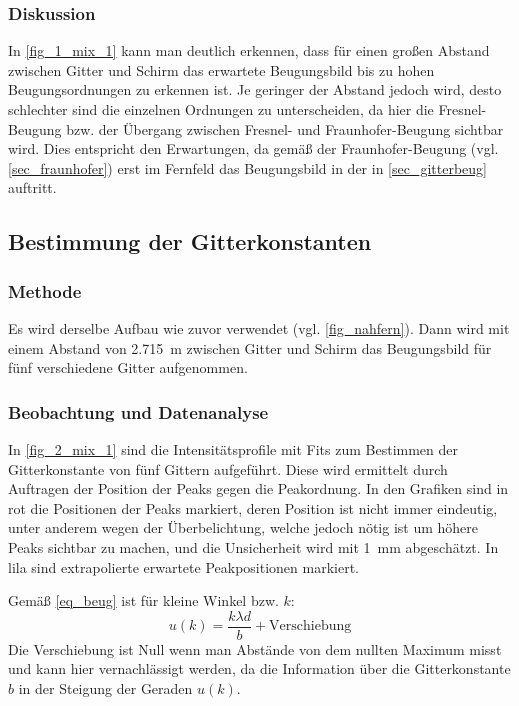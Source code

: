 \documentclass[
	a4paper,
	12pt,
	pagesize,
	ngerman
]{scrartcl}
\begin{document}
	\subsubsection*{Diskussion}
	In \cref{fig_1_mix_1} kann man deutlich erkennen, dass für einen großen Abstand zwischen Gitter und Schirm das erwartete Beugungsbild bis zu hohen Beugungsordnungen zu erkennen ist.
	Je geringer der Abstand jedoch wird, desto schlechter sind die einzelnen Ordnungen zu unterscheiden, da hier die Fresnel-Beugung bzw. der Übergang zwischen Fresnel- und Fraunhofer-Beugung sichtbar wird.
	Dies entspricht den Erwartungen, da gemäß der Fraunhofer-Beugung (vgl. \cref{sec_fraunhofer}) erst im Fernfeld das Beugungsbild in der in \cref{sec_gitterbeug} auftritt.

	\subsection{Bestimmung der Gitterkonstanten} \label{ss_2_beug}

	\subsubsection*{Methode}

	Es wird derselbe Aufbau wie zuvor verwendet (vgl. \cref{fig_nahfern}).
	Dann wird mit einem Abstand von \SI{2,715}{m} zwischen Gitter und Schirm das Beugungsbild für fünf verschiedene Gitter aufgenommen.

	\subsubsection*{Beobachtung und Datenanalyse}
 In \cref{fig_2_mix_1} sind die Intensitätsprofile mit Fits zum Bestimmen der Gitterkonstante von fünf Gittern aufgeführt.
 Diese wird ermittelt durch Auftragen der Position der Peaks gegen die Peakordnung.
 In den Grafiken sind in rot die Positionen der Peaks markiert, deren Position ist nicht immer eindeutig, unter anderem wegen der Überbelichtung, welche jedoch nötig ist um höhere Peaks sichtbar zu machen, und die Unsicherheit wird mit \SI{1}{mm} abgeschätzt.
 In lila sind extrapolierte erwartete Peakpositionen markiert.

 Gemäß \cref{eq_beug} ist für kleine Winkel bzw. $k$:
 \begin{equation}
	 \label{eq_beug_verschieb}
	 u(k) = \frac{k\lambda d}{b} + \text{Verschiebung}
 \end{equation}
 Die Verschiebung ist Null wenn man Abstände von dem nullten Maximum misst und kann hier vernachlässigt werden, da die Information über die Gitterkonstante $b$ in der Steigung der Geraden $u(k)$.
\end{document}

